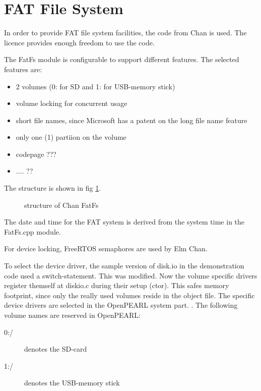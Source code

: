 

\section{FAT File System}
In order to provide FAT file system facilities, the code from Chan
is used. 
The licence provides enough freedom to use the code.

The FatFs module is configurable to support different features. 
The selected features are:
\begin{itemize}
\item 2 volumes (0: for SD and 1: for USB-memory stick)
\item volume locking for concurrent usage
\item short file names,
      since Microsoft has a patent on the long file name feature
\item only one (1) partiion on the volume
\item codepage ???
\item .... ??
\end{itemize}

The structure is shown in fig \ref{fig_chanfs}.
\begin{figure}
\setlength{\unitlength}{1mm}
\begin{center}
\caption{structure of Chan FatFs}
\label{fig_chanfs}
\end{center}
\end{figure}

The date and time for the FAT system is derived from the system time
in the FatFs.cpp module.

For device locking, FreeRTOS semaphores are used by Elm Chan.

To select the device driver, the sample version of disk.io 
in the demonstration code  used a switch-statement.
This was modified. Now the volume specific
drivers register themself at diskio.c during their setup (ctor).
This safes memory footprint, since only the really used volumes reside in
the object file.
The specific device drivers are selected in the OpenPEARL system part.
.
The following volume names are reserved in OpenPEARL:
\begin{description}
\item[0:/] denotes the SD-card
\item[1:/] denotes the USB-memory stick
\end{description}

